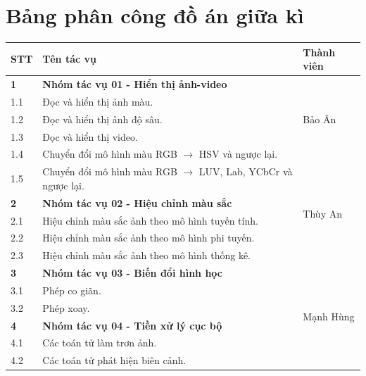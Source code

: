 \documentclass{article}
\begin{document}
\section{Bảng phân công đồ án giữa kì}
\begin{tabular}{|l | l | l|}
	\hline
	\textbf{STT} & \textbf{Tên tác vụ} & \textbf{Thành viên}\\
	\hline
	\textbf{1} & \textbf{Nhóm tác vụ 01 - Hiển thị ảnh-video} & \multirow{5}{*}{Bảo Ân}\\  \cline{1-2}
	1.1 & Đọc và hiển thị ảnh màu. & \\ \cline{1-2}
	1.2 & Đọc và hiển thị ảnh độ sâu. &\\ \cline{1-2}
	1.3 & Đọc và hiển thị video. &\\ \cline{1-2}
	1.4 & Chuyển đổi mô hình màu RGB $\to$ HSV và ngược lại. & \\ \hline
	1.5 & Chuyển đổi mô hình màu RGB $\to$ LUV, Lab, YCbCr và ngược lại. & \multirow{5}{*}{Thùy An}\\ \cline{1-2}
	\textbf{2} & \textbf{Nhóm tác vụ 02 - Hiệu chỉnh màu sắc} &\\ \cline{1-2}
	2.1 & Hiệu chỉnh màu sắc ảnh theo mô hình tuyến tính. & \\ \cline{1-2}
	2.2 & Hiệu chỉnh màu sắc ảnh theo mô hình phi tuyến. &\\ \cline{1-2}
	2.3 & Hiệu chỉnh màu sắc ảnh theo mô hình thống kê. &\\ \hline
	\textbf{3} & \textbf{Nhóm tác vụ 03 - Biến đổi hình học} & \multirow{6}{*}{Mạnh Hùng}\\ \cline{1-2}
	3.1 & Phép co giãn. & \\ \cline{1-2}
	3.2 & Phép xoay. &\\ \cline{1-2}
	\textbf{4} & \textbf{Nhóm tác vụ 04 - Tiền xử lý cục bộ} &\\ \cline{1-2}
	4.1 & Các toán tử làm trơn ảnh. &\\ \cline{1-2}
	4.2 & Các toán tử phát hiện biên cảnh. &\\ \hline
	
\end{tabular}
\end{document}
